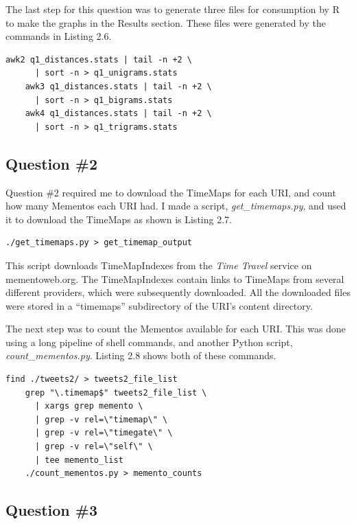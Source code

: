 \documentclass[a4paper,12pt]{article}
\begin{document}
The last step for this question was to generate three files for consumption by R to make the graphs in the
Results section. These files were generated by the commands in Listing 2.6.

\begin{lstlisting}[basicstyle=\ttfamily,caption={Generating R Input Files}]
    awk2 q1_distances.stats | tail -n +2 \
      | sort -n > q1_unigrams.stats
    awk3 q1_distances.stats | tail -n +2 \
      | sort -n > q1_bigrams.stats
    awk4 q1_distances.stats | tail -n +2 \
      | sort -n > q1_trigrams.stats
\end{lstlisting}

\subsection{Question \#2}
Question \#2 required me to download the TimeMaps for each URI, and count how many Mementos each URI had.
I made a script, \emph{get\_timemaps.py}, and used it to download the TimeMaps as shown is Listing 2.7.

\begin{lstlisting}[basicstyle=\ttfamily,caption={Downloading TimeMaps}]
    ./get_timemaps.py > get_timemap_output
\end{lstlisting}

This script downloads TimeMapIndexes from the \emph{Time Travel} service on mementoweb.org. The
TimeMapIndexes contain links to TimeMaps from several different providers, which were subsequently
downloaded. All the downloaded files were stored in a ``timemaps'' subdirectory of the URI's content
directory.

The next step was to count the Mementos available for each URI. This was done using a long pipeline of
shell commands, and another Python script, \emph{count\_mementos.py}. Listing 2.8 shows both of these
commands.

\begin{lstlisting}[basicstyle=\ttfamily,caption={Counting Mementos}]
    find ./tweets2/ > tweets2_file_list
    grep "\.timemap$" tweets2_file_list \
      | xargs grep memento \
      | grep -v rel=\"timemap\" \
      | grep -v rel=\"timegate\" \
      | grep -v rel=\"self\" \
      | tee memento_list
    ./count_mementos.py > memento_counts
\end{lstlisting}

\subsection{Question \#3}
\end{document}
